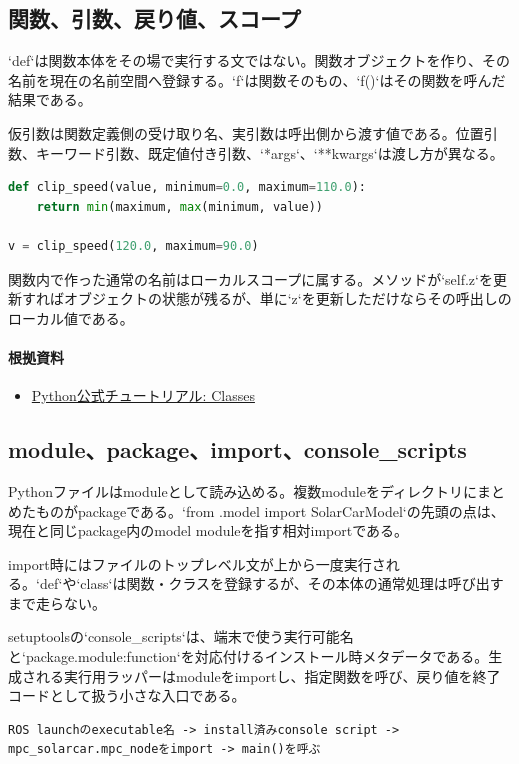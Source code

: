 \documentclass[a4paper,11pt]{article}
\begin{document}
\subsection{関数、引数、戻り値、スコープ}
`def`は関数本体をその場で実行する文ではない。関数オブジェクトを作り、その名前を現在の名前空間へ登録する。`f`は関数そのもの、`f()`はその関数を呼んだ結果である。


仮引数は関数定義側の受け取り名、実引数は呼出側から渡す値である。位置引数、キーワード引数、既定値付き引数、`*args`、`**kwargs`は渡し方が異なる。


\begin{lstlisting}[language=python]
def clip_speed(value, minimum=0.0, maximum=110.0):
    return min(maximum, max(minimum, value))

v = clip_speed(120.0, maximum=90.0)
\end{lstlisting}


関数内で作った通常の名前はローカルスコープに属する。メソッドが`self.z`を更新すればオブジェクトの状態が残るが、単に`z`を更新しただけならその呼出しのローカル値である。

\paragraph{根拠資料}
\begin{itemize}[leftmargin=1.6em]
\item \href{https://docs.python.org/3/tutorial/classes.html}{Python公式チュートリアル: Classes}
\end{itemize}

\subsection{module、package、import、console\_scripts}
Pythonファイルはmoduleとして読み込める。複数moduleをディレクトリにまとめたものがpackageである。`from .model import SolarCarModel`の先頭の点は、現在と同じpackage内のmodel moduleを指す相対importである。


import時にはファイルのトップレベル文が上から一度実行される。`def`や`class`は関数・クラスを登録するが、その本体の通常処理は呼び出すまで走らない。


setuptoolsの`console\_scripts`は、端末で使う実行可能名と`package.module:function`を対応付けるインストール時メタデータである。生成される実行用ラッパーはmoduleをimportし、指定関数を呼び、戻り値を終了コードとして扱う小さな入口である。


\begin{lstlisting}
ROS launchのexecutable名 -> install済みconsole script -> mpc_solarcar.mpc_nodeをimport -> main()を呼ぶ
\end{lstlisting}
\end{document}
